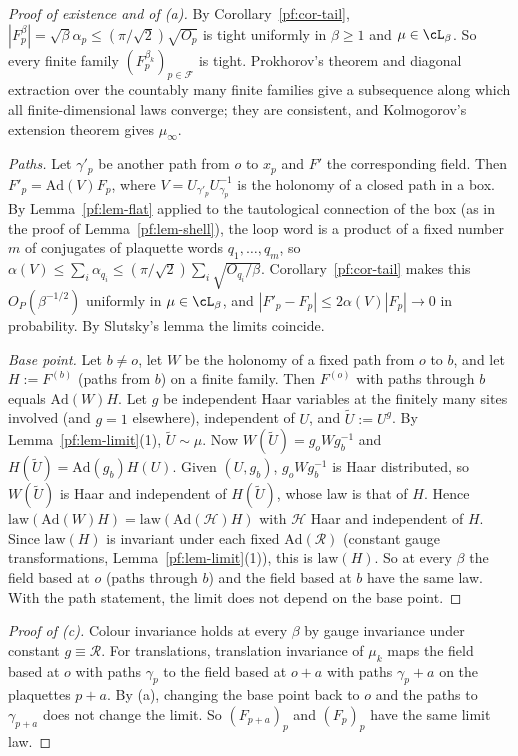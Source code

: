 \begin{proof}[Proof of existence and of (a)]
By Corollary~\ref{pf:cor-tail}, $|F^\beta_p|=\sqrt\beta\alpha_p\le(\pi/\sqrt2)\sqrt{O_p}$ is tight uniformly in $\beta\ge1$ and $\mu\in\cL_\beta$. So every finite family $(F^{\beta_k}_p)_{p\in\mathcal F}$ is tight. Prokhorov's theorem and diagonal extraction over the countably many finite families give a subsequence along which all finite-dimensional laws converge; they are consistent, and Kolmogorov's extension theorem gives $\mu_\infty$.

\emph{Paths.} Let $\gamma'_p$ be another path from $o$ to $x_p$ and $F'$ the corresponding field. Then $F'_p=\mathrm{Ad}(V)F_p$, where $V=U_{\gamma'_p}U_{\gamma_p}^{-1}$ is the holonomy of a closed path in a box. By Lemma~\ref{pf:lem-flat} applied to the tautological connection of the box (as in the proof of Lemma~\ref{pf:lem-shell}), the loop word is a product of a fixed number $m$ of conjugates of plaquette words $q_1,\dots,q_m$, so $\alpha(V)\le\sum_i\alpha_{q_i}\le(\pi/\sqrt2)\sum_i\sqrt{O_{q_i}/\beta}$. Corollary~\ref{pf:cor-tail} makes this $O_P(\beta^{-1/2})$ uniformly in $\mu\in\cL_\beta$, and $|F'_p-F_p|\le2\alpha(V)|F_p|\to0$ in probability. By Slutsky's lemma the limits coincide.

\emph{Base point.} Let $b\ne o$, let $W$ be the holonomy of a fixed path from $o$ to $b$, and let $H:=F^{(b)}$ (paths from $b$) on a finite family. Then $F^{(o)}$ with paths through $b$ equals $\mathrm{Ad}(W)H$. Let $g$ be independent Haar variables at the finitely many sites involved (and $g=1$ elsewhere), independent of $U$, and $\tilde U:=U^g$. By Lemma~\ref{pf:lem-limit}(1), $\tilde U\sim\mu$. Now $W(\tilde U)=g_oWg_b^{-1}$ and $H(\tilde U)=\mathrm{Ad}(g_b)H(U)$. Given $(U,g_b)$, $g_oWg_b^{-1}$ is Haar distributed, so $W(\tilde U)$ is Haar and independent of $H(\tilde U)$, whose law is that of $H$. Hence $\mathrm{law}(\mathrm{Ad}(W)H)=\mathrm{law}(\mathrm{Ad}(\mathcal H)H)$ with $\mathcal H$ Haar and independent of $H$. Since $\mathrm{law}(H)$ is invariant under each fixed $\mathrm{Ad}(\mathcal R)$ (constant gauge transformations, Lemma~\ref{pf:lem-limit}(1)), this is $\mathrm{law}(H)$. So at every $\beta$ the field based at $o$ (paths through $b$) and the field based at $b$ have the same law. With the path statement, the limit does not depend on the base point.
\end{proof}

\begin{proof}[Proof of (c)]
Colour invariance holds at every $\beta$ by gauge invariance under constant $g\equiv\mathcal R$. For translations, translation invariance of $\mu_k$ maps the field based at $o$ with paths $\gamma_p$ to the field based at $o+a$ with paths $\gamma_p+a$ on the plaquettes $p+a$. By (a), changing the base point back to $o$ and the paths to $\gamma_{p+a}$ does not change the limit. So $(F_{p+a})_p$ and $(F_p)_p$ have the same limit law.
\end{proof}

